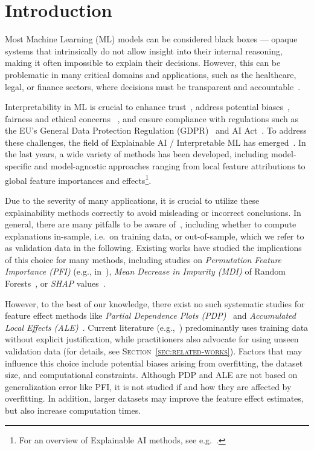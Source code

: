 \documentclass[runningheads]{llncs}
\begin{document}
\section{Introduction}
Most Machine Learning (ML) models can be considered black boxes --- opaque
systems that intrinsically do not allow insight into their internal reasoning,
making it often impossible to explain their decisions. However, this can be
problematic in many critical domains and applications, such as the healthcare,
legal, or finance sectors, where decisions must be transparent and
accountable~\cite{adadi_peeking_2018}.

Interpretability in ML is crucial to enhance
trust~\cite{ribeiro_why_2016,teach_analysis_1981}, address potential
biases~\cite{guidotti_survey_2019}, fairness and ethical concerns
~\cite{lipton_mythos_2018}, and ensure compliance with regulations such as the
EU's General Data Protection Regulation (GDPR)~\cite{gdpr2016} and AI
Act~\cite{euaia2024}. To address these challenges, the field of Explainable AI
/ Interpretable ML has emerged~\cite{adadi_peeking_2018}. In the last years, a
wide variety of methods has been developed, including model-specific and
model-agnostic approaches ranging from local feature attributions to global
feature importances and effects\footnote{For an overview of Explainable AI
    methods, see
    e.g.~\cite{adadi_peeking_2018,kamath_introduction_2021,molnar_interpretable_2022}.}.

Due to the severity of many applications, it is crucial to utilize these
explainability methods correctly to avoid misleading or incorrect conclusions.
In general, there are many pitfalls to be aware of~\cite{molnar_general_2022},
including whether to compute explanations in-sample, i.e.\ on training data, or
out-of-sample, which we refer to as validation data in the following. Existing
works have studied the implications of this choice for many methods, including
studies on \textit{Permutation Feature Importance (PFI) } (e.g.,
in~\cite{molnar_general_2022}), \textit{Mean Decrease in Impurity (MDI)} of
Random Forests~\cite{loecher_debiasing_2022}, or \textit{SHAP}
values~\cite{loecher_debiasing_2024}.

However, to the best of our knowledge, there exist no such systematic studies
for feature effect methods like \textit{Partial Dependence Plots
    (PDP)}~\cite{friedman_greedy_2001} and \textit{Accumulated Local Effects
    (ALE)}~\cite{apley_visualizing_2020}. Current literature
(e.g.,~\cite{apley_visualizing_2020,friedman_greedy_2001,molnar_interpretable_2022})
predominantly uses training data without explicit justification, while
practitioners also advocate for using unseen validation data (for details, see
\textsc{Section~\ref{sec:related-works}}). Factors that may influence this
choice include potential biases arising from overfitting, the dataset size, and
computational constraints. Although PDP and ALE are not based on generalization
error like PFI, it is not studied if and how they are affected by overfitting.
In addition, larger datasets may improve the feature effect estimates, but also
increase computation times.\\
\end{document}
